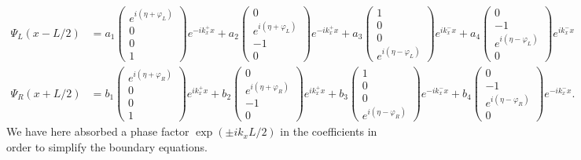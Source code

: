 \begin{equation}
\begin{split}
\Psi_L(x-L/2) &= 
a_1
\begin{pmatrix}
e^{i(\eta + \varphi_L)} \\ 0 \\ 0 \\ 1
\end{pmatrix}e^{-ik_x^+x}
+
a_2
\begin{pmatrix}
0 \\ e^{i(\eta+\varphi_L)} \\ -1 \\ 0
\end{pmatrix}e^{-ik_x^+x}
+
a_3
\begin{pmatrix}
1 \\0\\0 \\ e^{i(\eta-\varphi_L)}
\end{pmatrix}e^{ik_x^-x}
+
a_4
\begin{pmatrix}
0\\-1\\ e^{i(\eta-\varphi_L)}\\0
\end{pmatrix}e^{ik_x^-x}
\\
\Psi_R(x+L/2) &= 
b_1
\begin{pmatrix}
e^{i(\eta + \varphi_R)} \\ 0 \\ 0 \\ 1
\end{pmatrix}e^{ik_x^+x}
+
b_2
\begin{pmatrix}
0 \\ e^{i(\eta+\varphi_R)} \\ -1 \\ 0
\end{pmatrix}e^{ik_x^+x}
+
b_3
\begin{pmatrix}
1 \\0\\0 \\ e^{i(\eta-\varphi_R)}
\end{pmatrix}e^{-ik_x^-x}
+
b_4
\begin{pmatrix}
0\\-1\\ e^{i(\eta-\varphi_R)}\\0
\end{pmatrix}e^{-ik_x^-x}.
\end{split}
\end{equation}
We have here absorbed a phase factor $\exp(\pm ik_xL/2)$ in the coefficients in order to simplify the boundary equations. 

